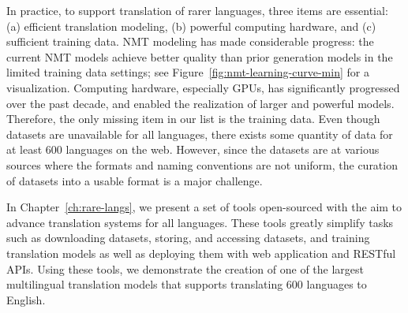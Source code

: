 In practice, to support translation of rarer languages, three items are essential: (a) efficient translation modeling, (b) powerful computing hardware, and (c) sufficient training data. 
NMT modeling has made considerable progress: the current NMT models achieve better quality than prior generation models in the limited training data settings; see Figure~\ref{fig:nmt-learning-curve-min} for a visualization. 
Computing hardware, especially GPUs, has significantly progressed over the past decade, and enabled the realization of larger and powerful models. 
Therefore, the only missing item in our list is the training data. 
Even though datasets are unavailable for all languages, there exists some quantity of data for at least 600 languages on the web. 
However, since the datasets are at various sources where the formats and naming conventions are not uniform, the curation of datasets into a usable format is a major challenge. 


In Chapter~\ref{ch:rare-langs}, we present a set of tools open-sourced with the aim to advance translation systems for all languages.
These tools greatly simplify tasks such as downloading datasets, storing, and accessing datasets, and training translation models as well as deploying them with web application and RESTful APIs. 
Using these tools, we demonstrate the creation of one of the largest multilingual translation models that supports translating 600 languages to English.

